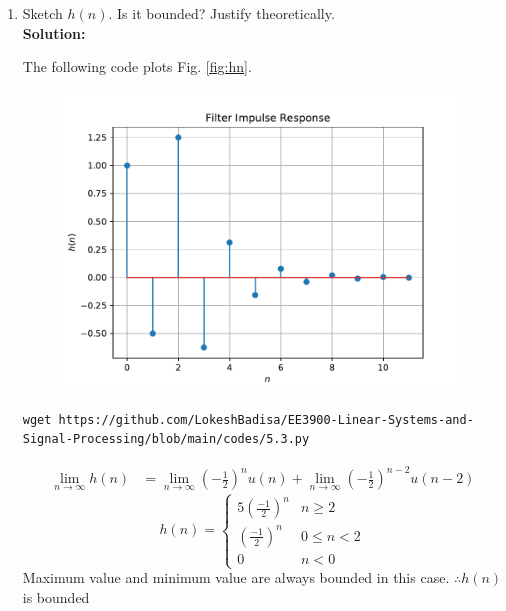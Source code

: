 \documentclass[journal,12pt,twocolumn]{IEEEtran}
\newcommand{\solution}{\noindent \textbf{Solution: }}
\providecommand{\brak}[1]{\ensuremath{\left(#1\right)}}
\numberwithin{equation}{section}
\renewcommand\thesection{\arabic{section}}
\begin{document}
\begin{enumerate}[label=\thesection.\arabic*]
\item Sketch $h(n)$. Is it bounded? Justify theoretically.
\\
\solution 

The following code plots Fig. \ref{fig:hn}.
\begin{figure}[!ht]
\begin{center}
\includegraphics[width=\columnwidth]{./figs/hn}
\end{center}
\label{fig:xnyn}	
\end{figure}
\begin{lstlisting}
wget https://github.com/LokeshBadisa/EE3900-Linear-Systems-and-Signal-Processing/blob/main/codes/5.3.py
\end{lstlisting}

\begin{align}
\lim_{n\to\infty}h(n)&=\lim_{n\to\infty}\brak{-\frac{1}{2}}^{n}u(n) + \lim_{n\to\infty}\brak{-\frac{1}{2}}^{n-2}u(n-2)
\end{align}
\begin{equation}
h(n)
=
\begin{cases}
5\brak{\frac{-1}{2}}^n & n \ge 2
\\
\brak{\frac{-1}{2}}^n & 0\le n < 2
\\
0 & n<0
\end{cases}
\end{equation}
Maximum value and minimum value are always bounded in this case.
$\therefore h(n)$ is bounded


\end{enumerate}
\end{document}
